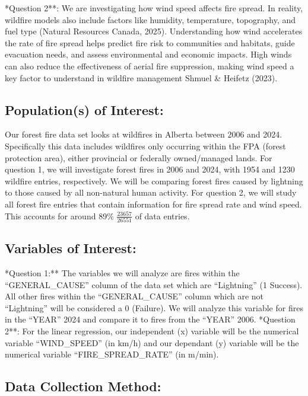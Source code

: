 \documentclass[
]{article}
\begin{document}
\indent **Question 2**: We are investigating how wind speed affects fire
spread. In reality, wildfire models also include factors like humidity,
temperature, topography, and fuel type (Natural Resources Canada, 2025).
Understanding how wind accelerates the rate of fire spread helps predict
fire risk to communities and habitats, guide evacuation needs, and
assess environmental and economic impacts. High winds can also reduce
the effectiveness of aerial fire suppression, making wind speed a key
factor to understand in wildfire management {Shmuel \& Heifetz (2023)}.

\subsection{Population(s) of Interest:}\label{populations-of-interest}

\indent Our forest fire data set looks at wildfires in Alberta between
2006 and 2024. Specifically this data includes wildfires only occurring
within the FPA (forest protection area), either provincial or federally
owned/managed lands. For question 1, we will investigate forest fires in
2006 and 2024, with 1954 and 1230 wildfire entries, respectively. We
will be comparing forest fires caused by lightning to those caused by
all non-natural human activity. For question 2, we will study all forest
fire entries that contain information for fire spread rate and wind
speed. This accounts for around 89\% \(\frac{23657}{26551}\) of data
entries.

\subsection{Variables of Interest:}\label{variables-of-interest}

\indent **Question 1:** The variables we will analyze are fires within
the ``GENERAL\_CAUSE'' column of the data set which are ``Lightning'' (1
Success). All other fires within the ``GENERAL\_CAUSE'' column which are
not ``Lightning'' will be considered a 0 (Failure). We will analyze this
variable for fires in the ``YEAR'' 2024 and compare it to fires from the
``YEAR'' 2006. \indent **Question 2**: For the linear regression, our
independent (x) variable will be the numerical variable ``WIND\_SPEED''
(in km/h) and our dependant (y) variable will be the numerical variable
``FIRE\_SPREAD\_RATE'' (in m/min).

\subsection{Data Collection Method:}\label{data-collection-method}
\end{document}
